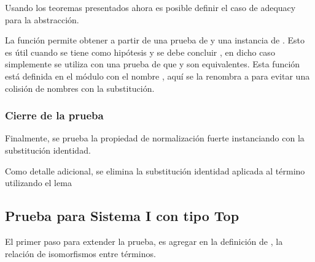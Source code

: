 

Usando los teoremas presentados ahora es posible definir el caso de adequacy para la abstracción.

\begin{samepage}
\end{samepage}

La función  permite obtener  a partir de una prueba de  \type{$\cong$}  y una instancia de .
Esto es útil cuando se tiene como hipótesis \snstar {} y se debe concluir \snstar {}, en dicho caso simplemente se utiliza  con una prueba de que  y  son equivalentes.
Esta función está definida en el módulo  con el nombre , aquí se la renombra a  para evitar una colisión de nombres con la substitución.

\subsubsection{Cierre de la prueba}

Finalmente, se prueba la propiedad de normalización fuerte instanciando  con la substitución identidad.

Como detalle adicional, se elimina la substitución identidad aplicada al término utilizando el lema
\AgdaSymbol{:}
\AgdaSymbol{\}}
\AgdaSymbol{\{}
\AgdaSymbol{:}
\AgdaSymbol{\}}


\subsection{Prueba para Sistema I con tipo Top}

El primer paso para extender la prueba, es agregar en la definición de , la relación de isomorfismos entre términos.


